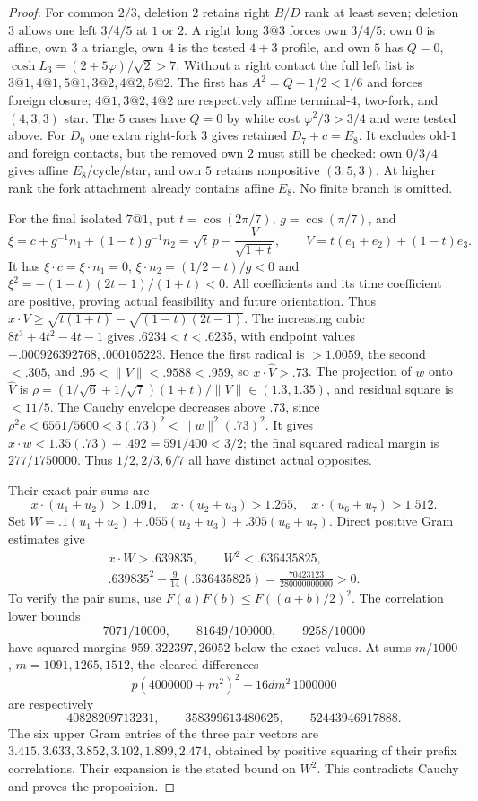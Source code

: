 \documentclass[11pt]{article}
\theoremstyle{definition}
\theoremstyle{remark}
\newcommand{\ph}{\varphi}
\begin{document}
\begin{proof}
For common $2/3$, deletion $2$ retains right $B/D$ rank at least
seven; deletion $3$ allows one left $3/4/5$ at $1$ or $2$.
A right long $3@3$ forces own $3/4/5$: own $0$ is affine, own $3$
a triangle, own $4$ is the tested $4+3$ profile, and own $5$ has
$Q=0$, $\cosh L_3=(2+5\ph)/\sqrt2>7$.
Without a right contact the full left list is
$3@1,4@1,5@1,3@2,4@2,5@2$.
The first has $A^2=Q-1/2<1/6$ and forces foreign closure;
$4@1,3@2,4@2$ are respectively affine terminal-$4$, two-fork,
and $(4,3,3)$ star. The $5$ cases have $Q=0$ by white cost
$\ph^2/3>3/4$ and were tested above.
For $D_9$ one extra right-fork $3$ gives retained $D_7+c=E_8$.
It excludes old-$1$ and foreign contacts, but the removed own $2$
must still be checked: own $0/3/4$ gives affine $E_8$/cycle/star,
and own $5$ retains nonpositive $(3,5,3)$. At higher rank the fork
attachment already contains affine $E_8$. No finite branch is omitted.

For the final isolated $7@1$, put $t=\cos(2\pi/7)$,
$g=\cos(\pi/7)$, and
\[
 \xi=c+g^{-1}n_1+(1-t)g^{-1}n_2
     =\sqrt t\,p-\frac V{\sqrt{1+t}},\qquad
 V=t(e_1+e_2)+(1-t)e_3.
\]
It has $\xi\cdot c=\xi\cdot n_1=0$,
$\xi\cdot n_2=(1/2-t)/g<0$ and
$\xi^2=-(1-t)(2t-1)/(1+t)<0$.
All coefficients and its time coefficient are positive, proving
actual feasibility and future orientation. Thus
$x\cdot V\ge\sqrt{t(1+t)}-\sqrt{(1-t)(2t-1)}$.
The increasing cubic $8t^3+4t^2-4t-1$ gives $.6234<t<.6235$,
with endpoint values $-.000926392768,.000105223$.
Hence the first radical is $>1.0059$, the second $<.305$,
and $.95<\|V\|<.9588<.959$, so $x\cdot\widehat V>.73$.
The projection of $w$ onto $\widehat V$ is
$\rho=(1/\sqrt6+1/\sqrt7)(1+t)/\|V\|\in(1.3,1.35)$,
and residual square is $<11/5$.
The Cauchy envelope decreases above $.73$, since
$\rho^2e<6561/5600<3(.73)^2<\|w\|^2(.73)^2$.
It gives $x\cdot w<1.35(.73)+.492=591/400<3/2$;
the final squared radical margin is $277/1750000$.
Thus $1/2,2/3,6/7$ all have distinct actual opposites.

Their exact pair sums are
\[
 x\cdot(u_1+u_2)>1.091,\quad
 x\cdot(u_2+u_3)>1.265,\quad
 x\cdot(u_6+u_7)>1.512.
\]
Set $W=.1(u_1+u_2)+.055(u_2+u_3)+.305(u_6+u_7)$. Direct positive
Gram estimates give
\[
\begin{gathered}
 x\cdot W>.639835,\qquad W^2<.636435825,\\
 .639835^2-\frac9{14}(.636435825)
 =\frac{70423123}{280000000000}>0.
\end{gathered}
\]
To verify the pair sums, use $F(a)F(b)\le F((a+b)/2)^2$.
The correlation lower bounds
\[
7071/10000,\qquad81649/100000,\qquad9258/10000
\]
have squared margins $959,\allowbreak322397,\allowbreak26052$ below the exact values.
At sums $m/1000$, $m=1091,\allowbreak1265,\allowbreak1512$, the cleared differences
\[
p(4000000+m^2)^2-16dm^2\,1000000
\]
are respectively
\[
40828209713231,\qquad358399613480625,\qquad52443946917888.
\]
The six upper Gram entries of the three pair vectors are
$3.415,3.633,3.852,3.102,1.899,2.474$, obtained by positive
squaring of their prefix correlations. Their expansion is the stated
bound on $W^2$. This contradicts Cauchy and proves the proposition.
\end{proof}
\end{document}
